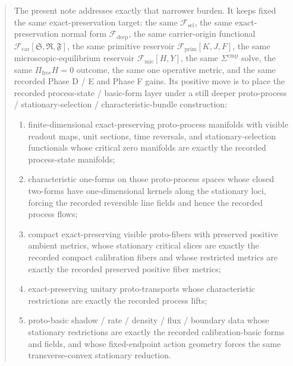 \documentclass[11pt]{article}
\newcommand{\GaugeAux}{Y}
\newcommand{\MicFunctional}{\mathscr F_{\mathrm{mic}}}
\newcommand{\PrimFunctional}{\mathscr F_{\mathrm{prim}}}
\newcommand{\CarrierFunctional}{\mathscr F_{\mathrm{car}}}
\newcommand{\DeepFunctional}{\mathscr F_{\mathrm{deep}}}
\newcommand{\StemFunctional}{\mathscr F_{\mathrm{sel}}}
\newcommand{\PrimStrain}{K}
\newcommand{\PrimNeutral}{J}
\newcommand{\PrimFree}{F}
\newcommand{\CarrierSeed}{\mathfrak S}
\newcommand{\RelabelSeed}{\mathfrak R}
\newcommand{\FreeSeed}{\mathfrak F}
\begin{document}
\begin{abstract}
The present note addresses exactly that narrower burden. It keeps fixed the same exact-preservation target: the same \(\StemFunctional\), the same exact-preservation normal form \(\DeepFunctional\), the same carrier-origin functional \(\CarrierFunctional[\CarrierSeed,\RelabelSeed,\FreeSeed]\), the same primitive reservoir \(\PrimFunctional[\PrimStrain,\PrimNeutral,\PrimFree]\), the same microscopic-equilibrium reservoir \(\MicFunctional[H,\GaugeAux]\), the same \(\Sigma^{\mathrm{cmp}}\) solve, the same \(\Pi_{\mathrm{free}}H=0\) outcome, the same one operative metric, and the same recorded Phase D / E and Phase F gains. Its positive move is to place the recorded process-state / basic-form layer under a still deeper proto-process / stationary-selection / characteristic-bundle construction:
\begin{enumerate}
    \item finite-dimensional exact-preserving proto-process manifolds with visible readout maps, unit sections, time reversals, and stationary-selection functionals whose critical zero manifolds are exactly the recorded process-state manifolds;
    \item characteristic one-forms on those proto-process spaces whose closed two-forms have one-dimensional kernels along the stationary loci, forcing the recorded reversible line fields and hence the recorded process flows;
    \item compact exact-preserving visible proto-fibers with preserved positive ambient metrics, whose stationary critical slices are exactly the recorded compact calibration fibers and whose restricted metrics are exactly the recorded preserved positive fiber metrics;
    \item exact-preserving unitary proto-transports whose characteristic restrictions are exactly the recorded process lifts;
    \item proto-basic shadow / rate / density / flux / boundary data whose stationary restrictions are exactly the recorded calibration-basic forms and fields, and whose fixed-endpoint action geometry forces the same transverse-convex stationary reduction.
\end{enumerate}


\end{abstract}
\end{document}
